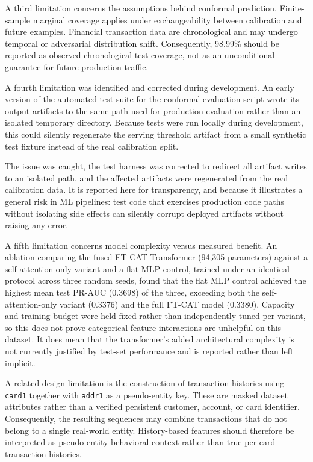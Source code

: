 \documentclass[conference]{IEEEtran}
\begin{document}
A third limitation concerns the assumptions behind conformal prediction.
Finite-sample marginal coverage applies under exchangeability between
calibration and future examples. Financial transaction data are chronological
and may undergo temporal or adversarial distribution shift. Consequently,
98.99\% should be reported as observed chronological test coverage, not as an
unconditional guarantee for future production traffic.

A fourth limitation was identified and corrected during development. An early
version of the automated test suite for the conformal evaluation script wrote
its output artifacts to the same path used for production evaluation rather
than an isolated temporary directory. Because tests were run locally during
development, this could silently regenerate the serving threshold artifact from
a small synthetic test fixture instead of the real calibration split.

The issue was caught, the test harness was corrected to redirect all artifact
writes to an isolated path, and the affected artifacts were regenerated from
the real calibration data. It is reported here for transparency, and because it
illustrates a general risk in ML pipelines: test code that exercises production
code paths without isolating side effects can silently corrupt deployed
artifacts without raising any error.

A fifth limitation concerns model complexity versus measured benefit. An
ablation comparing the fused FT-CAT Transformer (94{,}305 parameters) against
a self-attention-only variant and a flat MLP control, trained under an identical
protocol across three random seeds, found that the flat MLP control achieved
the highest mean test PR-AUC (0.3698) of the three, exceeding both the
self-attention-only variant (0.3376) and the full FT-CAT model (0.3380).
Capacity and training budget were held fixed rather than independently tuned per
variant, so this does not prove categorical feature interactions are unhelpful
on this dataset. It does mean that the transformer's added architectural
complexity is not currently justified by test-set performance and is reported
rather than left implicit.

A related design limitation is the construction of transaction histories using
\texttt{card1} together with \texttt{addr1} as a pseudo-entity key. These are
masked dataset attributes rather than a verified persistent customer, account,
or card identifier. Consequently, the resulting sequences may combine
transactions that do not belong to a single real-world entity. History-based
features should therefore be interpreted as pseudo-entity behavioral context
rather than true per-card transaction histories.
\end{document}
